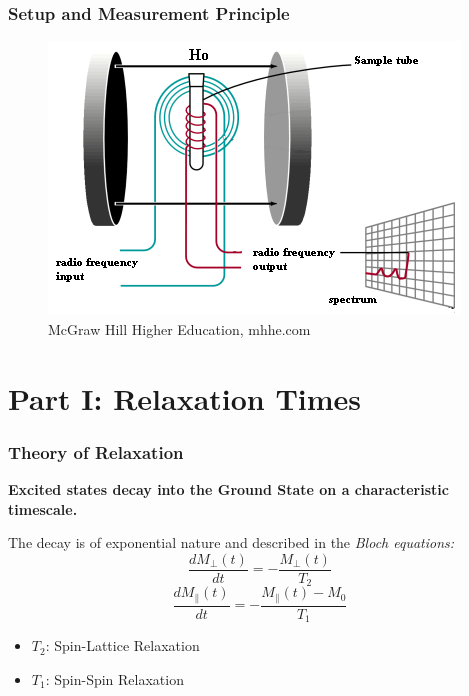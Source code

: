 \documentclass[aspectratio=169]{beamer}
\begin{document}
\begin{frame}
	\frametitle{Setup and Measurement Principle}
	\begin{figure}[H]
		\centering
		\includegraphics[height=0.7 \textheight]{./Resources/setup.png}
		\caption{\tiny{McGraw Hill Higher Education, mhhe.com}}
	\end{figure}
\end{frame}

\section{Part I: Relaxation Times}

\begin{frame}
	\frametitle{Theory of Relaxation}
	\textbf{Excited states decay into the Ground State on a characteristic timescale.}
	
	The decay is of exponential nature and described in the \textit{Bloch equations:}
	\begin{equation}
	\frac{dM_{\perp}(t)}{dt} = - \frac{M_{\perp}(t)}{T_2}
	\end{equation}
	\begin{equation}
	\frac{dM_{\parallel}(t)}{dt} = - \frac{M_{\parallel}(t) - M_0}{T_1}
	\end{equation}
	
	\begin{itemize}
		\item $T_2$: Spin-Lattice Relaxation
		\item $T_1$: Spin-Spin Relaxation
	\end{itemize}
\end{frame}
\end{document}
